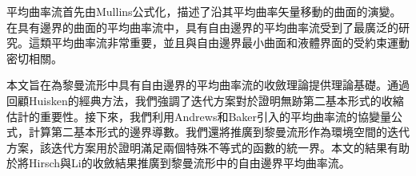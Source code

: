 

    平均曲率流首先由Mullins\cite{mullins_twodimensional_1956}公式化，描述了沿其平均曲率矢量移動的曲面的演變。在具有邊界的曲面的平均曲率流中，具有自由邊界的平均曲率流受到了最廣泛的研究。這類平均曲率流非常重要，並且與自由邊界最小曲面和液體界面的受約束運動密切相關。

本文旨在為黎曼流形中具有自由邊界的平均曲率流的收斂理論提供理論基礎。通過回顧Huisken\cite{huisken_flow_1984}的經典方法，我們強調了迭代方案對於證明無跡第二基本形式的收縮估計的重要性。接下來，我們利用Andrews和Baker\cite{andrews_mean_2010}引入的平均曲率流的協變量公式，計算第二基本形式的邊界導數。我們還將\cite[Theorem 3.1]{edelen_convexity_2016}推廣到黎曼流形作為環境空間的迭代方案，該迭代方案用於證明滿足兩個特殊不等式的函數的統一界。本文的結果有助於將Hirsch與Li\cite{hirsch2020contracting}的收斂結果推廣到黎曼流形中的自由邊界平均曲率流。
    

